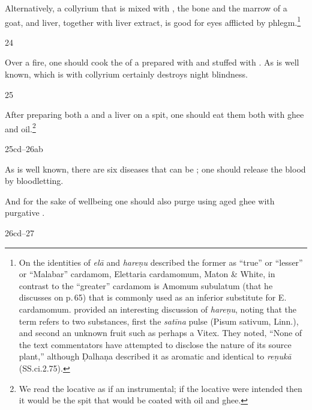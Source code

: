 \begin{translation}
    Alternatively, a collyrium that is  mixed with
    , the bone and the marrow of a goat, 
    and liver, together with liver extract, is good for eyes afflicted by
    phlegm.\footnote{On the identities of \emph{elā} and \emph{hareṇu}
    \citet[511\,ff]{watt-comm} described the former as “true” or “lesser” or “Malabar”
    cardamom, Elettaria cardamomum, Maton \& White, in contrast to the “greater”
    cardamom is Amomum subulatum (that he discusses on p.\,65) that is commonly 
    used
    as an inferior substitute for E. cardamomum. \citet[467\,f]{sing-1972} provided an
    interesting discussion of \emph{hareṇu}, noting that the term refers to two
    substances, first the \emph{satīna} pulse (Pisum sativum, Linn.), and second an
    unknown fruit such as perhaps a Vitex. They noted, “None of the text commentators
    have attempted to disclose the nature of its source plant,” although Ḍalhaṇa
    described it as aromatic and identical to \emph{reṇukā} (SS.ci.2.75).%
    }
    
    \item[24] 
    
    Over a fire, one should cook the  of a  
    prepared
    with  and stuffed with .  As is well 
    known,  which is  with collyrium certainly 
    destroys night blindness.
    
    
    \item [25] 
    
    After preparing both a  and a liver on a spit, one should eat them
    both with ghee and oil.\footnote{We read the locative as if an instrumental; if the
    locative were intended then it would be the spit that would be coated with oil and
    ghee.}
    
    \item [25cd--26ab]
    
    As is well known, there are  six diseases that can be ;
     one should release the blood by bloodletting.
    
    And for the sake of wellbeing one should also purge using aged ghee 
     with 
    purgative . 
    
    \item[26cd--27]
    

\end{translation}
